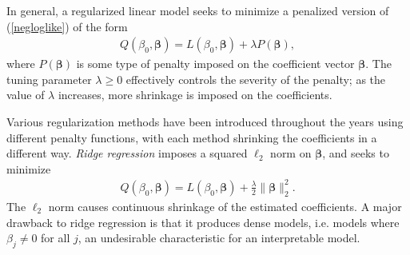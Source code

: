 \documentclass[11pt]{article}
\begin{document}




In general, a regularized linear model seeks to minimize a penalized version of (\ref{negloglike}) of the form
\begin{align*}
    Q(\beta_0, \bm{\beta}) = L(\beta_0, \bm{\beta}) + \lambda P(\bm{\beta}),
\end{align*}
where $P(\bm{\beta})$ is some type of penalty imposed on the coefficient vector $\bm{\beta}$. The tuning parameter $\lambda \ge 0$ effectively controls the severity of the penalty; as the value of $\lambda$ increases, more shrinkage is imposed on the coefficients. 

Various regularization methods have been introduced throughout the years using different penalty functions, with each method shrinking the coefficients in a different way. \textit{Ridge regression} \cite{hoerl1970ridge} imposes a squared $\ell_2$ norm on $\bm{\beta}$, and seeks to minimize 
\begin{align}
    \label{ridgeregression}
    Q(\beta_0, \bm{\beta}) = L(\beta_0, \bm{\beta}) + \frac{\lambda}{2} \| \bm{\beta} \|_2^2.
\end{align}
The $\ell_2$ norm causes continuous shrinkage of the estimated coefficients. %
A major drawback to ridge regression is that it produces dense models, i.e. models where $\beta_j \not = 0$ for all $j$, an undesirable characteristic for an interpretable model.
\end{document}
